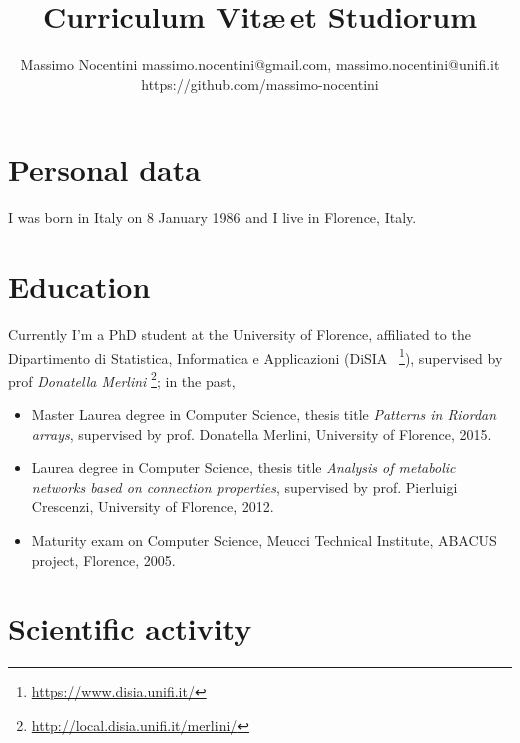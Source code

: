 \documentclass[a4paper]{tufte-handout}
\begin{document}
    \title{Curriculum Vit\ae\,et Studiorum}

    \author{Massimo Nocentini\newline
        \small{{massimo.nocentini@gmail.com}},
        \small{{massimo.nocentini@unifi.it}}\newline
        \small{{https://github.com/massimo-nocentini}}
    }

    \maketitle

    \section{Personal data}
    
    I was born in Italy on 8 January 1986 and I live in Florence, Italy. 

    \section{Education}

    Currently I'm a PhD student at the University of Florence, affiliated to the
    Dipartimento di Statistica, Informatica e Applicazioni (DiSIA~
    \footnote{\url{https://www.disia.unifi.it/}}), supervised by prof
    \textit{Donatella Merlini}
    \footnote{\url{http://local.disia.unifi.it/merlini/}}; in the past,

    \begin{itemize}
        \item Master Laurea degree in Computer Science, thesis title \emph{Patterns in Riordan arrays}, 
            supervised by prof. Donatella Merlini, University of Florence, 2015.
        \item Laurea degree in Computer Science, thesis title \emph{Analysis of metabolic networks based on connection properties}, 
            supervised by prof. Pierluigi Crescenzi, University of Florence, 2012.
        \item Maturity exam on Computer Science, Meucci Technical Institute, ABACUS project, Florence, 2005.
    \end{itemize}

    \section{Scientific activity}
    
\end{document}
